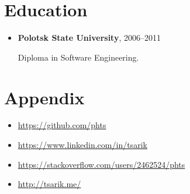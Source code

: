 \documentclass[a4paper, 12pt]{article}
\newcommand{\position}[1]{
    \textbf{#1}}
\begin{document}
\section*{Education}

    \begin{itemize}

        \item \position{Polotsk State University}, 2006--2011

            Diploma in Software Engineering.

    \end{itemize}

\section*{Appendix}

    \begin{itemize}
        \item \href{https://github.com/phts}{https://github.com/phts}
        \item \href{https://www.linkedin.com/in/tsarik}{https://www.linkedin.com/in/tsarik}
        \item \href{https://stackoverflow.com/users/2462524/phts}{https://stackoverflow.com/users/2462524/phts}
        \item \href{http://tsarik.me/}{http://tsarik.me/}
    \end{itemize}
\end{document}
